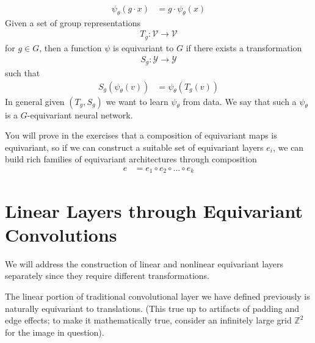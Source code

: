 \documentclass[book.tex]{subfiles}
\begin{document}
\begin{align}
\psi_\theta(g \cdot x) &= g \cdot \psi_\theta(x)
\end{align}
Given a set of group representations \begin{align}
T_g: \mathcal{V} \to \mathcal{V} 
\end{align} for $g \in G$, then a function $\psi$ is equivariant to $G$ if there exists a transformation 
\begin{align}
 S_g: \mathcal{Y} \to \mathcal{Y}   
\end{align} such that
\begin{align}
S_g(\psi_\theta(v)) &= \psi_\theta(T_g(v))
\end{align}
In general given $(T_g, S_g)$ we want to learn $\psi_\theta$ from data. We say that such a $\psi_\theta$ is a $G$-equivariant neural network.

You will prove in the exercises that a composition of equivariant maps is equivariant, so if we can construct a suitable set of equivariant layers $e_i$, we can build rich families of equivariant architectures through composition
\begin{align}
e &= e_1 \circ e_2 \circ \dotsc \circ e_k
\end{align}

\section{Linear Layers through Equivariant Convolutions}

We will address the construction of linear and nonlinear equivariant layers separately since they require different transformations.

The linear portion of traditional convolutional layer we have defined previously is naturally equivariant to translations. (This true up to artifacts of padding and edge effects; to make it mathematically true, consider an infinitely large grid $\mathbb{Z}^2$ for the image in question).
\end{document}
